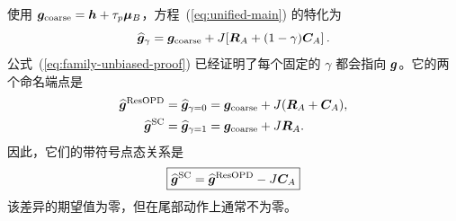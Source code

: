 使用 $\bm{g}_{\mathrm{coarse}}=\bm{h}+\tau_p\bm{\mu}_B$，方程~(\ref{eq:unified-main}) 的特化为
\begin{equation}
 \widehat{\bm{g}}_\gamma
 =\bm{g}_{\mathrm{coarse}}
 +J\!\left[\bm{R}_A+(1-\gamma)\bm{C}_A\right].
 \label{eq:event-scta-family}
\end{equation}
公式~(\ref{eq:family-unbiased-proof}) 已经证明了每个固定的 $\gamma$ 都会指向 $\bm{g}$。它的两个命名端点是
\begin{equation}
 \begin{aligned}
 \widehat{\bm{g}}^{\mathrm{ResOPD}}
 &=\widehat{\bm{g}}_{\gamma=0}
  =\bm{g}_{\mathrm{coarse}}+J(\bm{R}_A+\bm{C}_A),\\
 \widehat{\bm{g}}^{\mathrm{SC}}
 &=\widehat{\bm{g}}_{\gamma=1}
  =\bm{g}_{\mathrm{coarse}}+J\bm{R}_A.
 \end{aligned}
\end{equation}
因此，它们的带符号点态关系是
\begin{equation}
 \boxed{
 \widehat{\bm{g}}^{\mathrm{SC}}
 =\widehat{\bm{g}}^{\mathrm{ResOPD}}-J\bm{C}_A
 }
 \label{eq:event-scta-difference}
\end{equation}
该差异的期望值为零，但在尾部动作上通常不为零。

